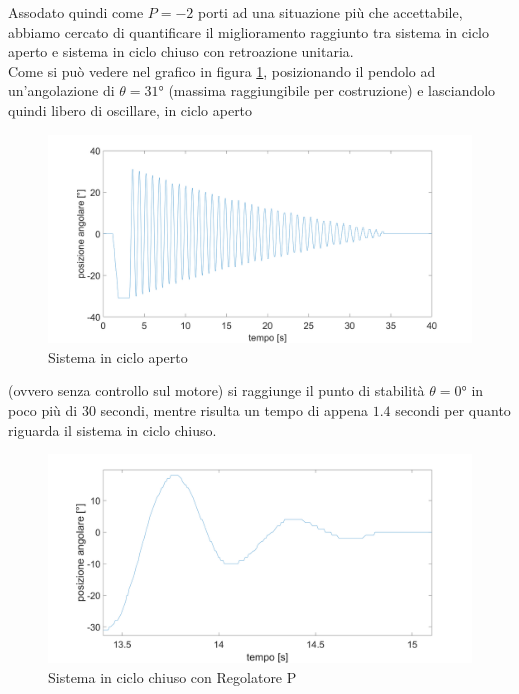 Assodato quindi come $P=-2$ porti ad una situazione più che accettabile, abbiamo cercato di quantificare il miglioramento raggiunto tra sistema in ciclo aperto e sistema in ciclo chiuso con retroazione unitaria.\\
Come si può vedere nel grafico in figura \ref{oscillOL}, posizionando il pendolo ad un'angolazione di $\theta=\ang{31}$ (massima raggiungibile per costruzione) e lasciandolo quindi libero di oscillare, in ciclo aperto
\begin{figure}[ht]
	\centering
	\includegraphics[width=\linewidth]{oscillOL.PNG}
	\caption{Sistema in ciclo aperto}
	\label{oscillOL}
\end{figure}
 (ovvero senza controllo sul motore) si raggiunge il punto di stabilità $\theta=\ang{0}$ in poco più di $30$ secondi, mentre risulta un tempo di appena $1.4$ secondi per quanto riguarda il sistema in ciclo chiuso.
\begin{figure}[ht]
	\centering
	\includegraphics[width=\linewidth]{oscillCL.PNG}
	\caption{Sistema in ciclo chiuso con Regolatore P}
	\label{oscillCL}
\end{figure} 


